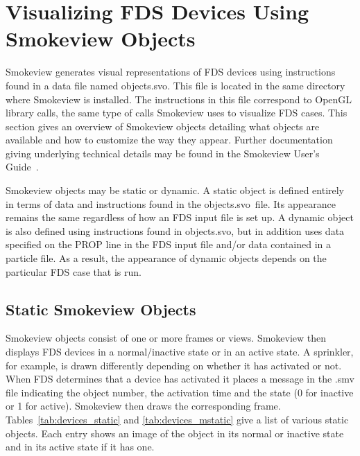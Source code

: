 
\newcommand{\devicewidth}{1.5in}
\newcommand{\boxwidth}{3.0in}
\newcommand{\incgraphics}[1]{
\parbox[c]{\devicewidth}{
\vspace{0.01in}
\texttt{[image: \#1]}
\vspace{0.01in}
}
}

\section{Visualizing FDS Devices Using Smokeview Objects}

Smokeview generates visual representations of FDS devices using instructions found in a data file named {\ct objects.svo}.  This file is located in the same directory where Smokeview is installed.  The instructions in this file correspond to OpenGL library calls, the same type of calls Smokeview uses to visualize FDS cases.  This section gives an overview of Smokeview objects detailing what objects are available and how to customize the way they appear. Further documentation giving underlying technical details may be found in the Smokeview User's Guide~\cite{Smokeview_Users_Guide}.

Smokeview objects may be static or dynamic.  A static object is defined entirely in terms of data and instructions found in the {\ct objects.svo}\ file.  Its appearance remains the same regardless of how an FDS input file is set up.  A dynamic object is also defined using instructions found in {\ct objects.svo}, but in addition uses data specified on the {\ct PROP}  line in the FDS input file and/or data contained in a particle file.  As a result, the appearance of dynamic objects depends on the particular FDS case that is run.


\subsection{Static Smokeview Objects}
\label{info:SMOKEVIEW_ID}

Smokeview objects consist of one or more frames or views.  Smokeview then displays FDS devices in a normal/inactive
state or in an active state.  A sprinkler, for example, is drawn differently depending on whether it has activated
or not.  When FDS determines that a device has activated it places a message in the {\ct .smv} file indicating the
object number, the activation time and the state (0 for inactive or 1 for active).  Smokeview then draws the corresponding
frame.  Tables~\ref{tab:devices_static} and \ref{tab:devices_mstatic} give a list of various static objects.  Each entry shows
an image of the object in its normal or inactive state and in its active state if it has one.

